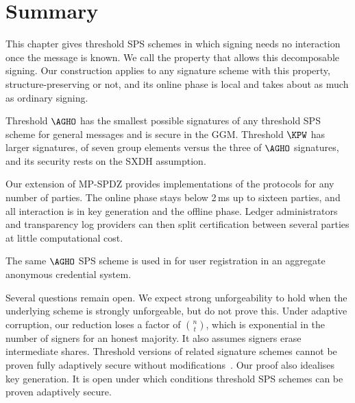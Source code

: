\FloatBarrier
\section{Summary}\label{sec:tsps-summary}

This chapter gives threshold SPS schemes in which signing needs no interaction
once the message is known. We call the property that allows this decomposable
signing.  Our construction applies to any signature scheme with this property,
structure-preserving or not, and its online phase is local and takes about as
much as ordinary signing.

Threshold $\AGHO$ has the smallest possible signatures of any threshold SPS
scheme for general messages and is secure in the GGM. Threshold $\KPW$ has
larger signatures, of seven group elements versus the three of $\AGHO$
signatures, and its security rests on the SXDH assumption.

Our extension of MP-SPDZ provides implementations of the protocols for any
number of parties. The online phase stays below 2\,ms up to sixteen parties, and
all interaction is in key generation and the offline phase.  Ledger administrators and
transparency log providers can then split certification between several parties
at little computational cost.

The same $\AGHO$ SPS scheme is used in  for user
registration in an aggregate anonymous credential system.

Several questions remain open. We expect strong unforgeability to hold
when the underlying scheme is strongly unforgeable, but do not prove this.
Under adaptive corruption, our reduction loses a factor of $\binom{n}{t}$,
which is exponential in the number of signers for an honest majority. It also
assumes signers erase intermediate shares. Threshold versions of related signature schemes cannot be proven fully adaptively secure without
modifications~\cite{C:CriSte25}. Our proof also idealises key generation.
It is open under which conditions threshold SPS schemes can be proven
adaptively secure.
